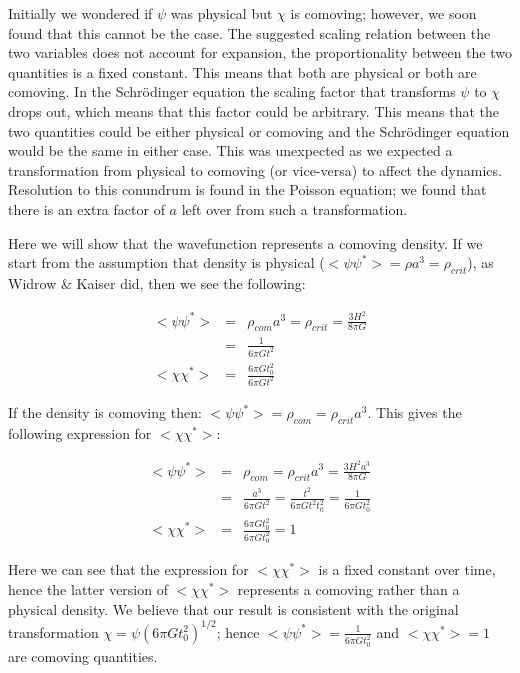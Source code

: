 Initially we wondered if $\psi$ was physical but $\chi$ is comoving; however, we soon found that this cannot be the case. The suggested scaling relation between the two variables does not account for expansion, the proportionality between the two quantities is a fixed constant. This means that both are physical or both are comoving. In the Schr\"odinger equation the scaling factor that transforms $\psi$ to $\chi$ drops out, which means that this factor could be arbitrary. This means that the two quantities could be either physical or comoving and the Schr\"odinger equation would be the same in either case. This was unexpected as we expected a transformation from physical to comoving (or vice-versa) to affect the dynamics. Resolution to this conundrum is found in the Poisson equation; we found that there is an extra factor of $a$ left over from such a transformation.

Here we will show that the wavefunction represents a comoving density. If we start from the assumption that density is physical ($<\psi \psi^*>= \rho a^3 = \rho_{crit}$), as Widrow \& Kaiser did, then we see the following:

\begin{eqnarray}
<\psi \psi^*> &=& \rho_{com} a^3 = \rho_{crit} = \frac{3 H^2}{8\pi G} \\
	 &=& \frac{1}{6\pi G t^2} \\
<\chi \chi^*> &=& \frac{6\pi G t_0^2}{6\pi G t^2}
\end{eqnarray}

\noindent If the density is comoving then: $<\psi \psi^*>= \rho_{com} = \rho_{crit} a^3 $. This gives the following expression for $<\chi \chi^*>$:

\begin{eqnarray}
<\psi \psi^*> &=& \rho_{com} = \rho_{crit} a^3 = \frac{3 H^2 a^3}{8\pi G} \\
	 &=& \frac{a^3}{6\pi G t^2} = \frac{t^2}{6\pi G t^2 t_0^2} = \frac{1}{6\pi G t_0^2} \\
<\chi \chi^*> &=& \frac{6\pi G t_0^2}{6\pi G t_0^2} = 1
\end{eqnarray}

\noindent Here we can see that the expression for $<\chi \chi^*>$ is a fixed constant over time, hence the latter version of $<\chi \chi^*>$ represents a comoving rather than a physical density. We believe that our result is consistent with the original transformation $\chi = \psi (6 \pi G t_0^2 )^{1/2}$; hence $<\psi \psi^*> = \frac{1}{6\pi G t_0^2}$ and $<\chi \chi^*> = 1$ are comoving quantities.

